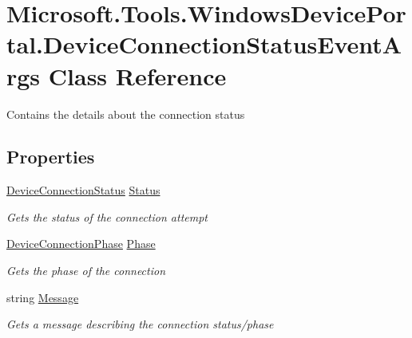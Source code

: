 \hypertarget{class_microsoft_1_1_tools_1_1_windows_device_portal_1_1_device_connection_status_event_args}{}\section{Microsoft.\+Tools.\+Windows\+Device\+Portal.\+Device\+Connection\+Status\+Event\+Args Class Reference}
\label{class_microsoft_1_1_tools_1_1_windows_device_portal_1_1_device_connection_status_event_args}


Contains the details about the connection status  


\subsection*{Properties}
\begin{DoxyCompactItemize}
\item 
\hyperlink{namespace_microsoft_1_1_tools_1_1_windows_device_portal_acbff0faba4b2b8843a2ca4e6333a9407}{Device\+Connection\+Status} \hyperlink{class_microsoft_1_1_tools_1_1_windows_device_portal_1_1_device_connection_status_event_args_a7f2688e4f3d9f1197da47e978039e9e3}{Status}
\begin{DoxyCompactList}\small\item\em Gets the status of the connection attempt \end{DoxyCompactList}\item 
\hyperlink{namespace_microsoft_1_1_tools_1_1_windows_device_portal_a5d17e74cf37845e22e0498ad89a3bc66}{Device\+Connection\+Phase} \hyperlink{class_microsoft_1_1_tools_1_1_windows_device_portal_1_1_device_connection_status_event_args_a6cbabfbdb80a64eac43534636f2f4642}{Phase}
\begin{DoxyCompactList}\small\item\em Gets the phase of the connection \end{DoxyCompactList}\item 
string \hyperlink{class_microsoft_1_1_tools_1_1_windows_device_portal_1_1_device_connection_status_event_args_a8dd7575be719c8369dfdc4f9fce16107}{Message}
\begin{DoxyCompactList}\small\item\em Gets a message describing the connection status/phase \end{DoxyCompactList}\end{DoxyCompactItemize}


